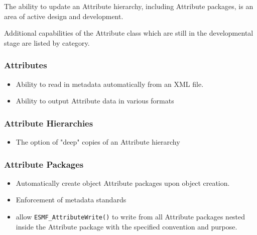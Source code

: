 %

The ability to update an Attribute hierarchy, including Attribute packages, is an area of active design and development.

Additional capabilities of the Attribute class which are still in the developmental stage are listed by category.
 
\subsubsection{Attributes}

\begin{itemize}
\item Ability to read in metadata automatically from an XML file.
\item Ability to output Attribute data in various formats
\end{itemize}

\subsubsection{Attribute Hierarchies}

\begin{itemize}
\item The option of "deep" copies of an Attribute hierarchy
\end{itemize}

\subsubsection{Attribute Packages}

\begin{itemize}
\item Automatically create object Attribute packages upon object creation.
\item Enforcement of metadata standards
\item allow {\tt ESMF\_AttributeWrite()} to write from all Attribute packages nested inside the Attribute package with the specified convention and purpose.
\end{itemize}
